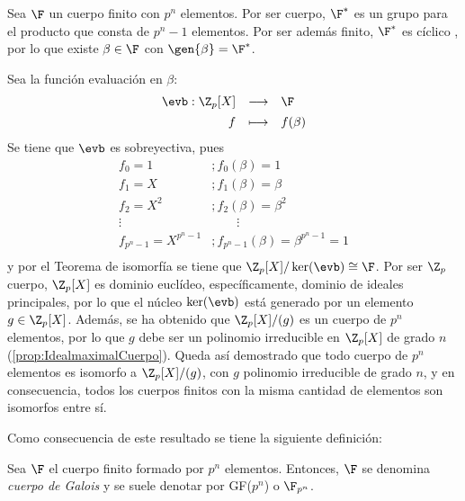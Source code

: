 \begin{dem}{\cite[p.~417]{GamboaAnillos}}
    Sea $\F$ un cuerpo finito con $p^n$ elementos. Por ser cuerpo, $\F^*$ es un grupo para el producto que consta de $p^n-1$ elementos. Por ser además finito, $\F^*$ es cíclico \cite[pp.~136-137]{Rosenberger}, por lo que existe $\beta\in\F$ con $\gen{\beta} = \F^*$.
    
    \item Sea la función evaluación en $\beta$:\vspace{-0.5em}
    \[
    \begin{array}{rcl}
    \evb: \Z_p[X] & \longrightarrow & \F \\[1ex]
    f & \longmapsto & f(\beta)
    \end{array}
    \]
    Se tiene que $\evb$ es sobreyectiva, pues \vspace{-0.5em}
    \[
    \begin{array}{ll}
    f_0 = 1&; f_0(\beta) =1 \\
    f_1 = X&; f_1(\beta) =\beta \\
    f_2 = X^2&; f_2(\beta) =\beta^2 \\
     \vdots\quad\quad   &\quad\quad\vdots\\
    f_{p^n-1} = X^{p^n-1}&; f_{p^n-1}(\beta) =\beta^{p^n-1} = 1 \\
    \end{array}
    \]    
    y por el Teorema de isomorfía se tiene que $\Z_p[X]/\ker(\evb) \cong \F$. Por ser $\Z_p$ cuerpo, $\Z_p[X]$ es dominio euclídeo, específicamente, dominio de ideales principales, por lo que el núcleo $\ker(\evb)$ está generado por un elemento $g\in\Z_p[X]$. Además, se ha obtenido que $\Z_p[X]/(g)$ es un cuerpo de $p^n$ elementos, por lo que $g$ debe ser un polinomio irreducible en $\Z_p[X]$ de grado $n$ (\ref{prop:IdealmaximalCuerpo}). Queda así demostrado que todo cuerpo de $p^n$ elementos es isomorfo a  $\Z_p[X]/(g)$, con $g$ polinomio irreducible de grado $n$, y en consecuencia, todos los cuerpos finitos con la misma cantidad de elementos son isomorfos entre sí.
\end{dem}


    Como consecuencia de este resultado se tiene la siguiente definición:
    \begin{deff}{\cite[p.~278]{Hungerford}}
        Sea $\F$ el cuerpo finito formado por $p^n$ elementos. Entonces, $\F$ se denomina \textit{cuerpo de Galois} y se suele denotar por GF($p^n$) o $\F_{p^n}$.
    \end{deff}
    
